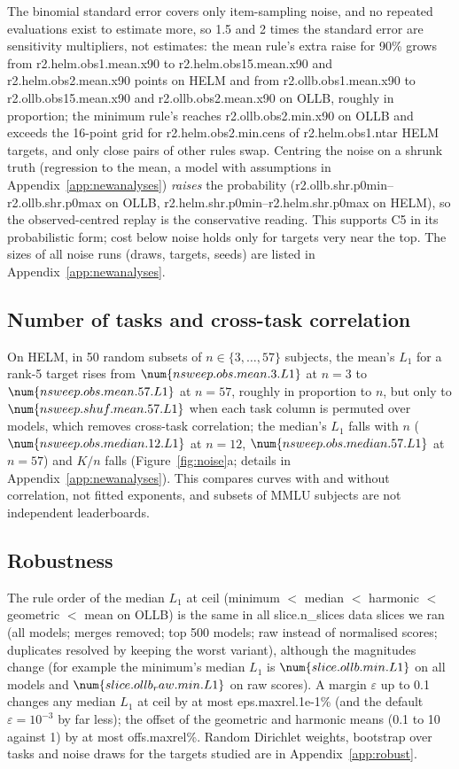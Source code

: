 The binomial standard error covers only item-sampling noise, and no repeated evaluations exist to estimate more, so 1.5 and 2 times the standard error are sensitivity multipliers, not estimates: the mean rule's extra raise for 90\% grows from \num{r2.helm.obs1.mean.x90} to \num{r2.helm.obs15.mean.x90} and \num{r2.helm.obs2.mean.x90} points on HELM and from \num{r2.ollb.obs1.mean.x90} to \num{r2.ollb.obs15.mean.x90} and \num{r2.ollb.obs2.mean.x90} on OLLB, roughly in proportion; the minimum rule's reaches \num{r2.ollb.obs2.min.x90} on OLLB and exceeds the 16-point grid for \num{r2.helm.obs2.min.cens} of \num{r2.helm.obs1.ntar} HELM targets, and only close pairs of other rules swap. Centring the noise on a shrunk truth (regression to the mean, a model with assumptions in Appendix~\ref{app:newanalyses}) \emph{raises} the probability (\num{r2.ollb.shr.p0min}--\num{r2.ollb.shr.p0max} on OLLB, \num{r2.helm.shr.p0min}--\num{r2.helm.shr.p0max} on HELM), so the observed-centred replay is the conservative reading. This supports C5 in its probabilistic form; cost below noise holds only for targets very near the top.
The sizes of all noise runs (draws, targets, seeds) are listed in Appendix~\ref{app:newanalyses}.


\subsection{Number of tasks and cross-task correlation}\label{sec:nsweep}
On HELM, in 50 random subsets of $n\in\{3,\dots,57\}$ subjects, the mean's $L_1$ for a rank-5 target rises from $\num{nsweep.obs.mean.3.L1}$ at $n=3$ to $\num{nsweep.obs.mean.57.L1}$ at $n=57$, roughly in proportion to $n$, but only to $\num{nsweep.shuf.mean.57.L1}$ when each task column is permuted over models, which removes cross-task correlation; the median's $L_1$ falls with $n$ ($\num{nsweep.obs.median.12.L1}$ at $n=12$, $\num{nsweep.obs.median.57.L1}$ at $n=57$) and $K/n$ falls (Figure~\ref{fig:noise}a; details in Appendix~\ref{app:newanalyses}). This compares curves with and without correlation, not fitted exponents, and subsets of MMLU subjects are not independent leaderboards.

\subsection{Robustness}\label{sec:robust}
The rule order of the median $L_1$ at \textsf{ceil} (minimum $<$ median $<$ harmonic $<$ geometric $<$ mean on OLLB) is the same in all \num{slice.n_slices} data slices we ran (all models; merges removed; top 500 models; raw instead of normalised scores; duplicates resolved by keeping the worst variant), although the magnitudes change (for example the minimum's median $L_1$ is $\num{slice.ollb.min.L1}$ on all models and $\num{slice.ollb_raw.min.L1}$ on raw scores). A margin $\varepsilon$ up to 0.1 changes any median $L_1$ at \textsf{ceil} by at most \num{eps.maxrel.1e-1}\% (and the default $\varepsilon=10^{-3}$ by far less); the offset of the geometric and harmonic means (0.1 to 10 against 1) by at most \num{offs.maxrel}\%. Random Dirichlet weights, bootstrap over tasks and noise draws for the targets studied are in Appendix~\ref{app:robust}.
